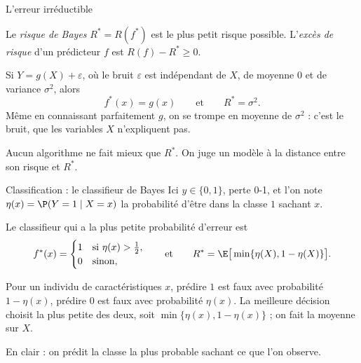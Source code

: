 \documentclass[aspectratio=169,11pt]{beamer}
\begin{document}
\begin{frame}{L'erreur irréductible}
  \begin{definition}
    Le \emph{risque de Bayes} $R^*=R(f^*)$ est le plus petit risque possible. L'\emph{excès de risque} d'un prédicteur $f$ est $R(f)-R^*\ge0$.
  \end{definition}
  \begin{exemple}
    Si $Y=g(X)+\varepsilon$, où le bruit $\varepsilon$ est indépendant de $X$, de moyenne $0$ et de variance $\sigma^2$, alors
    \[
      f^*(x)=g(x)\qquad\text{et}\qquad R^*=\sigma^2 .
    \]
    Même en connaissant parfaitement $g$, on se trompe en moyenne de $\sigma^2$ : c'est le bruit, que les variables $X$ n'expliquent pas.
  \end{exemple}
  \begin{aretenir}
    Aucun algorithme ne fait mieux que $R^*$. On juge un modèle à la distance entre son risque et $R^*$.
  \end{aretenir}
\end{frame}

\begin{frame}{Classification : le classifieur de Bayes}
  Ici $y\in\{0,1\}$, perte 0-1, et l'on note $\eta(x)=\P(Y=1\mid X=x)$ la probabilité d'être dans la classe $1$ sachant $x$.
  \begin{theoreme}
    Le classifieur qui a la plus petite probabilité d'erreur est
    \[
      f^*(x)=\begin{cases}1&\text{si }\eta(x)>\frac12,\\0&\text{sinon,}\end{cases}
      \qquad\text{et}\qquad R^*=\E\big[\min\{\eta(X),1-\eta(X)\}\big].
    \]
  \end{theoreme}
  \begin{preuve}
    Pour un individu de caractéristiques $x$, prédire $1$ est faux avec probabilité $1-\eta(x)$, prédire $0$ est faux avec probabilité $\eta(x)$.
    La meilleure décision choisit la plus petite des deux, soit $\min\{\eta(x),1-\eta(x)\}$ ; on fait la moyenne sur $X$.
  \end{preuve}
  {\small\color{cnfGris}En clair : on prédit la classe la plus probable sachant ce que l'on observe.}
\end{frame}
\end{document}
